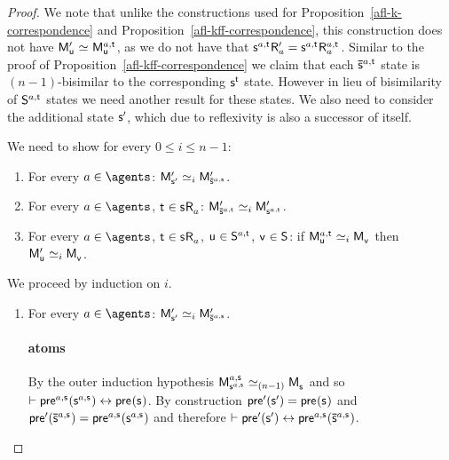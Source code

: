 \begin{proof}
We note that unlike the constructions used for Proposition~\ref{afl-k-correspondence} and Proposition~\ref{afl-kff-correspondence}, this construction does not have $\aPModelP{\aStateU} \bisimilar \aPModel[\agentA,\aStateT]{\aStateU}$, as we do not have that 
$\aStateS[\agentA,\aStateT] \aAccessibilityP{\agentA} = \aStateS[\agentA,\aStateT] \aAccessibility[\agentA,\aStateT]{\agentA}$.
Similar to the proof of Proposition~\ref{afl-kff-correspondence} we claim that each $\aPStateS[\agentA,\aStateT]$ state is $(n-1)$-bisimilar to the corresponding $\aStateS[\aStateT]$ state. 
However in lieu of bisimilarity of $\aStates[\agentA,\aStateT]$ states we need another result for these states.
We also need to consider the additional state ${\mathsf{{s}}^{\prime}}$, which due to reflexivity is also a successor of itself.

We need to show for every $0 \leq i \leq n - 1$: 
\begin{enumerate}
    \item For every $\agentA \in \agents$: $\aPModelP{\aStateSP} \bisimilar[i] \aPModelP{\aPStateS[\agentA,\aStateS]}$.
    \item For every $\agentA \in \agents$, $\aStateT \in \aStateS \aAccessibility{\agentA}$: $\aPModelP{\aPStateS[\agentA,\aStateT]} \bisimilar[i] \aPModelP{\aStateS[\agentA,\aStateT]}$.
    \item For every $\agentA \in \agents$, $\aStateT \in \aStateS \aAccessibility{\agentA}$, $\aStateU \in \aStates[\agentA,\aStateT]$, $\aStateV \in \aStates$: if $\aPModel[\agentA,\aStateT]{\aStateU} \bisimilar[i] \aPModel{\aStateV}$ then $\aPModelP{\aStateU} \bisimilar[i] \aPModel{\aStateV}$.
\end{enumerate}

We proceed by induction on $i$.

\begin{enumerate}
    \item 
        For every $\agentA \in \agents$: $\aPModelP{\aStateSP} \bisimilar[i] \aPModelP{\aPStateS[\agentA,\aStateS]}$.

        \paragraph{atoms}

        By the outer induction hypothesis $\aPModel[\agentA,\aStateS]{\aStateS[\agentA,\aStateS]} \bisimilar[(n - 1)] \aPModel{\aStateS}$ and so $\proves \aPrecondition[\agentA,\aStateS](\aStateS[\agentA,\aStateS]) \iff \aPrecondition(\aStateS)$.
        By construction $\aPreconditionP(\aStateSP) = \aPrecondition(\aStateS)$ and $\aPreconditionP(\aPStateS[\agentA,\aStateS]) = \aPrecondition[\agentA,\aStateS](\aStateS[\agentA,\aStateS])$ and therefore $\proves \aPreconditionP(\aStateSP) \iff \aPrecondition[\agentA,\aStateS](\aPStateS[\agentA,\aStateS])$.


\end{enumerate}
\end{proof}
